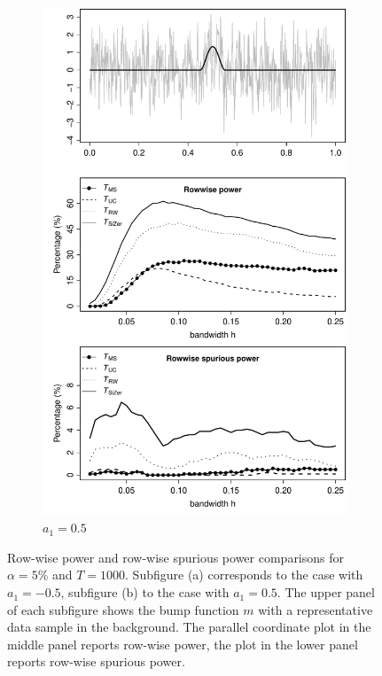 \begin{figure}[t!]
\begin{subfigure}{0.5\textwidth}
\includegraphics[width=\linewidth]{Plots/pcp_power_T_1000_a1_50.pdf}
\caption{$a_1 = 0.5$}
\end{subfigure}
\caption{Row-wise power and row-wise spurious power comparisons for $\alpha=5\%$ and $T=1000$. Subfigure (a) corresponds to the case with $a_1=-0.5$, subfigure (b) to the case with $a_1=0.5$. The upper panel of each subfigure shows the bump function $m$ with a representative data sample in the background. The parallel coordinate plot in the middle panel reports row-wise power, the plot in the lower panel reports row-wise spurious power.}\label{fig:sim:power:bump}
\end{figure}


